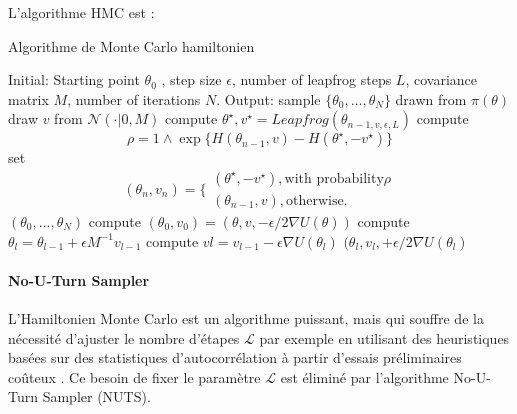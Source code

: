 \noindent L’algorithme HMC est :

\begin{algorithm}
	\caption{Algorithme de Monte Carlo hamiltonien \cite{wu2018faster}}
	\label{hmc_algo}
	\begin{algorithmic}[1]
		\State Initial: Starting point $\theta_{0}$ , step size $\epsilon $, number of leapfrog steps $L$, covariance matrix $M$, number of iterations $N$.
		\State Output: sample $\{ \theta_{0},...,\theta_{N}\}$ drawn from $\pi(\theta)$
			\State draw $v$ from $\mathcal{N}(\cdot|0,M)$ 
			\State compute $\theta^{\star},v^{\star} = Leapfrog(\theta_{n-1,v,\epsilon,L})$ compute
			\begin{equation}
				\rho = 1 \wedge \exp \{ H(\theta_{n-1},v) - H(\theta^{\star},-v^{\star})\}
			\end{equation}
			\State set
			\begin{equation}
				(\theta_{n},v_{n}) = \Biggl\{
				\begin{array}{ll}
					(\theta^{\star},-v^{\star}), \text{with probability} \rho \\
					(\theta_{n-1},v), \text{otherwise.}
				\end{array}
			\end{equation}
		\EndFor
		\State \Return $(\theta_{0},...,\theta_{N})$
			\State compute $(\theta_{0},v_{0}) = (\theta,v,- \epsilon / 2 \nabla U(\theta))$
				\State compute $\theta_{l} = \theta_{l-1} + \epsilon M^{-1}v_{l-1}$
				\State compute $v{l} = v_{l-1} -\epsilon \nabla U(\theta_{l})$
			\EndFor
			\State \Return $(\theta_{l},v_{l},+ \epsilon / 2 \nabla U(\theta_{l})$
		\EndFunction
	\end{algorithmic}
\end{algorithm}

\paragraph{No-U-Turn Sampler \\}
L’Hamiltonien Monte Carlo est un algorithme puissant, mais qui souffre de la nécessité d'ajuster le nombre d'étapes \(\displaystyle \mathcal{L}  \) par exemple en utilisant des heuristiques basées sur des statistiques d'autocorrélation à partir d'essais préliminaires coûteux \cite{neal2011mcmc}. Ce besoin de fixer le paramètre \(\displaystyle \mathcal{L}  \) est éliminé par l’algorithme No-U-Turn Sampler (NUTS). \\


